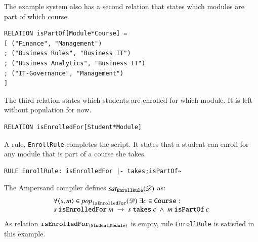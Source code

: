 \documentclass{elsarticle}
\begin{document}
   The example system also has a second relation that states which modules are part of which course.
\begin{verbatim}
RELATION isPartOf[Module*Course] =
[ ("Finance", "Management")
; ("Business Rules", "Business IT")
; ("Business Analytics", "Business IT")
; ("IT-Governance", "Management")
]
\end{verbatim}
   The third relation states which students are enrolled for which module.
   It is left without population for now.
\begin{verbatim}
RELATION isEnrolledFor[Student*Module]
\end{verbatim}

   A rule, {\tt EnrollRule} completes the script.
   It states that a student can enroll for any module that is part of a course she takes.
\begin{verbatim}
RULE EnrollRule: isEnrolledFor |- takes;isPartOf~
\end{verbatim}
   The Ampersand compiler defines $\text{\it sat\/}_{\tt EnrollRule}(\mathscr{D})$ as:
\begin{equation}
   \begin{array}{l}
   \forall \pair{s}{m}\in\pop{\tt isEnrolledFor}{\dataset}\ \exists c\in\text{\tt Course}:\\
   s\ \text{\tt isEnrolledFor}\ m\ \rightarrow\ s\ \text{\tt takes}\ c\ \wedge\ m\ \text{\tt isPartOf}\ c
   \end{array}
\label{eqn:example isEnrolledFor}
\end{equation}
   As relation $\text{\it \tt isEnrolledFor\/}_{\langle{\tt Student},{\tt Module}\rangle}$ is empty, rule {\tt EnrollRule} is satisfied in this example.
\end{document}
